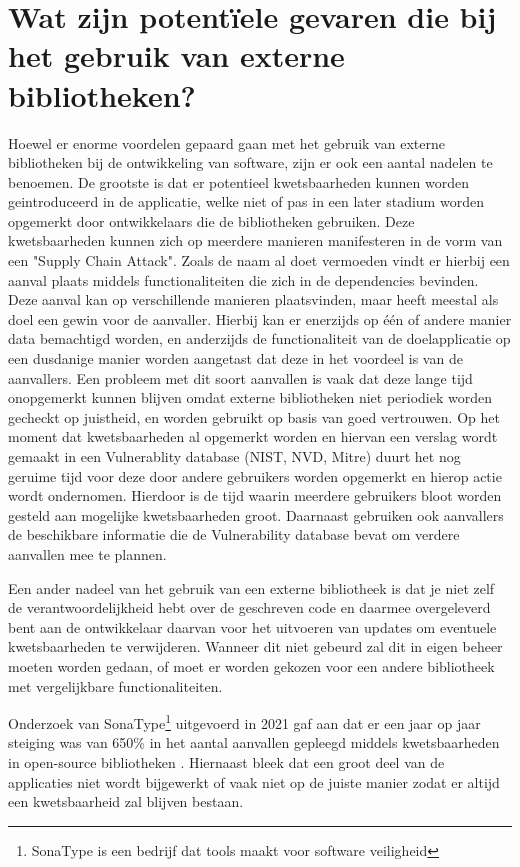 \section{Wat zijn potentïele gevaren die bij het gebruik van externe bibliotheken?} \label{sec:wat-zijn-potienteel-gevaren-die-het-gebruik-van-externe-bibliotheken?}
Hoewel er enorme voordelen gepaard gaan met het gebruik van externe bibliotheken bij de ontwikkeling van software, zijn er ook een aantal nadelen te benoemen. De grootste is dat er potentieel kwetsbaarheden kunnen worden geintroduceerd in de applicatie, welke niet of pas in een later stadium worden opgemerkt door ontwikkelaars die de bibliotheken gebruiken. Deze kwetsbaarheden kunnen zich op meerdere manieren manifesteren in de vorm van een "Supply Chain Attack". Zoals de naam al doet vermoeden vindt er hierbij een aanval plaats middels functionaliteiten die zich in de dependencies bevinden. Deze aanval kan op verschillende manieren plaatsvinden, maar heeft meestal als doel een gewin voor de aanvaller. Hierbij kan er enerzijds op één of andere manier data bemachtigd worden, en anderzijds de functionaliteit van de doelapplicatie op een dusdanige manier worden aangetast dat deze in het voordeel is van de aanvallers. Een probleem met dit soort aanvallen is vaak dat deze lange tijd onopgemerkt kunnen blijven omdat externe bibliotheken niet periodiek worden gecheckt op juistheid, en worden gebruikt op basis van goed vertrouwen. Op het moment dat kwetsbaarheden al opgemerkt worden en hiervan een verslag wordt gemaakt in een Vulnerablity database (NIST, NVD, Mitre) duurt het nog geruime tijd voor deze door andere gebruikers worden opgemerkt en hierop actie wordt ondernomen. Hierdoor is de tijd waarin meerdere gebruikers bloot worden gesteld aan mogelijke kwetsbaarheden groot. Daarnaast gebruiken ook aanvallers de beschikbare informatie die de Vulnerability database bevat om verdere aanvallen mee te plannen.

Een ander nadeel van het gebruik van een externe bibliotheek is dat je niet zelf de verantwoordelijkheid hebt over de geschreven code en daarmee overgeleverd bent aan de ontwikkelaar daarvan voor het uitvoeren van updates om eventuele kwetsbaarheden te verwijderen. Wanneer dit niet gebeurd zal dit in eigen beheer moeten worden gedaan, of moet er worden gekozen voor een andere bibliotheek met vergelijkbare functionaliteiten.

Onderzoek van SonaType\footnote{SonaType is een bedrijf dat tools maakt voor software veiligheid} uitgevoerd in 2021 gaf aan dat er een jaar op jaar steiging was van 650\% in het aantal aanvallen gepleegd middels kwetsbaarheden in open-source bibliotheken \citep{Sonatype:2021}.
Hiernaast bleek dat een groot deel van de applicaties niet wordt bijgewerkt of vaak niet op de juiste manier zodat er altijd een kwetsbaarheid zal blijven bestaan.

